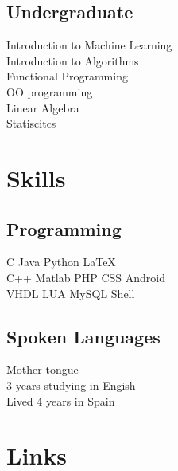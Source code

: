 \documentclass[letterpaper]{deedy-resume} %
\begin{document}
\begin{minipage}[t]{0.33\textwidth}
\subsection{Undergraduate}

Introduction to Machine Learning\\
Introduction to Algorithms\\
Functional Programming \\
OO programming\\
Linear Algebra\\
Statiscitcs \\

\sectionspace %


\section{Skills}
\subsection{Programming}

C  \textbullet{} Java \textbullet{} Python \textbullet{} \LaTeX\ \\ 
C++ \textbullet{} Matlab \textbullet{} PHP \textbullet{} CSS \textbullet{} Android\\
VHDL \textbullet{} LUA \textbullet{} MySQL \textbullet{} Shell



\sectionspace %

\subsection{Spoken Languages}

Mother tongue\\
3 years studying in Engish\\
Lived 4 years in Spain

\sectionspace %


\section{Links} 


\end{minipage}
\end{document}
